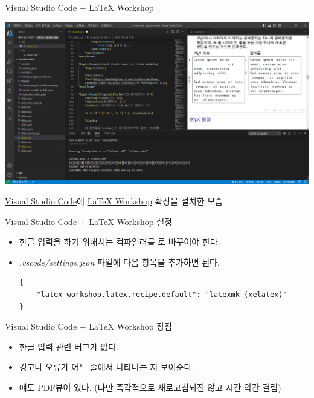 \documentclass{beamer}
\begin{document}
\begin{frame}{Visual Studio Code + LaTeX Workshop}
    \begin{center}
        \includegraphics[scale=0.25]{images/vscode.png}
    \end{center}
    \href{https://code.visualstudio.com/}{Visual Studio Code}에 \href{https://marketplace.visualstudio.com/items?itemName=James-Yu.latex-workshop}{LaTeX Workshop} 확장을 설치한 모습
\end{frame}

\begin{frame}[fragile]{Visual Studio Code + LaTeX Workshop 설정}
    \begin{itemize}
        \item 한글 입력을 하기 위해서는 컴파일러를 \XeLaTeX{}로 바꾸어야 한다.
        \item \emph{.vscode/settings.json} 파일에 다음 항목을 추가하면 된다.
        \begin{lstlisting}[language={}]
{
    "latex-workshop.latex.recipe.default": "latexmk (xelatex)"
}
        \end{lstlisting}
    \end{itemize}
\end{frame}

\begin{frame}{Visual Studio Code + LaTeX Workshop 장점}
    \begin{itemize}
        \item 한글 입력 관련 버그가 없다.
        \item 경고나 오류가 어느 줄에서 나타나는 지 보여준다.
        \item 얘도 PDF뷰어 있다. (다만 즉각적으로 새로고침되진 않고 시간 약간 걸림)
    \end{itemize}
\end{frame}
\end{document}

